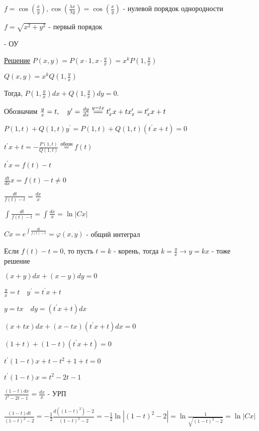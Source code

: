 \documentclass[12pt]{article}
\begin{document}
    \Ex $f = \cos\left(\frac{x}{y}\right), \cos(\frac{\lambda x}{\lambda y}) = \cos(\frac{x}{y})$ - нулевой порядок однородности

    $f = \sqrt{x^2 + y^2}$ - первый порядок

      - ОУ

    \underline{Решение} $P(x, y) = P\left(x \cdot 1, x \cdot \frac{y}{x}\right) = x^k P\left(1, \frac{y}{x}\right)$

    $Q(x, y) = x^k Q\left(1, \frac{y}{x}\right)$

    Тогда, $P\left(1, \frac{y}{x}\right)dx + Q\left(1, \frac{y}{x}\right)dy = 0$.

    Обозначим $\frac{y}{x} = t, \quad y^\prime = \frac{dy}{dx} \stackrel{y = tx}{=\joinrel=} t^\prime_x x + t x^\prime_x = t^\prime_x x + t$

    $P(1, t) + Q(1, t)y^\prime = P(1, t) + Q(1, t)(t^\prime x + t) = 0$

    $t^\prime x + t = -\frac{P(1, t)}{Q(1, t)} \stackrel{\text{обозн}}{=} f(t)$

    $t^\prime x = f(t) - t$

    $\frac{dt}{dx}x = f(t) - t \neq 0$

    $\frac{dt}{f(t) - t} = \frac{dx}{x}$

    $\int\frac{dt}{f(t) - t} = \int\frac{dx}{x} = \ln|Cx|$

    $Cx = e^{\int\frac{dt}{f(t) - t}} = \varphi(x, y)$ - общий интеграл

    Если $f(t) - t = 0$, то пусть $t = k$ - корень, тогда $k = \frac{y}{x} \to y = kx$ - тоже решение

    \Ex $(x + y)dx + (x - y)dy = 0$

    $\frac{y}{x} = t \quad y^\prime = t^\prime x + t$

    $y = tx \quad dy = (t^\prime x + t)dx$

    $(x + tx)dx + (x - tx)(t^\prime x + t)dx = 0$

    $(1 + t) + (1 - t)(t^\prime x + t) = 0$

    $t^\prime (1 - t) x + t - t^2 + 1 + t = 0$

    $t^\prime (1 - t) x = t^2 - 2t - 1$

    $\frac{(1 - t) dx}{t^2 - 2t - 1} = \frac{dx}{x}$ - УРП

    $\frac{(1 - t)dt}{(1 - t)^2 - 2} = -\frac{1}{2}\frac{d((1 - t)^2) - 2}{(1 - t)^2 - 2} = -\frac{1}{2}\ln|(1 - t)^2 - 2| = \ln\frac{1}{\sqrt{(1 - t)^2 - 2}} = \ln|Cx|$
\end{document}
